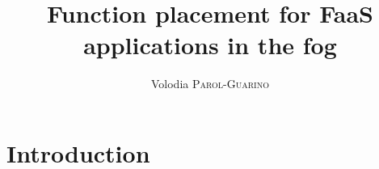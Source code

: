 \documentclass[11pt]{sdm}
\title{Function placement for FaaS applications in the fog}
\author{Volodia \textsc{Parol-Guarino}}
\begin{document}
\maketitle


\section{Introduction}
\end{document}
